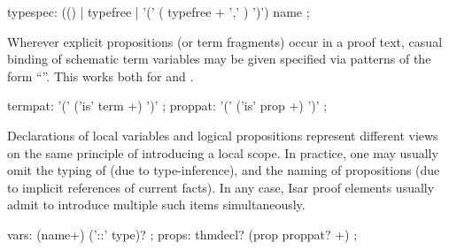 \begin{isabellebody}
\begin{isamarkuptext}
  \begin{rail}
    typespec: (() | typefree | '(' ( typefree + ',' ) ')') name
    ;
  \end{rail}%
\end{isamarkuptext}%
\isamarkuptrue%
%
\isamarkuptrue%
%
\begin{isamarkuptext}%
Wherever explicit propositions (or term fragments) occur in a proof
  text, casual binding of schematic term variables may be given
  specified via patterns of the form ``''.  This works both for  and .

  \begin{rail}
    termpat: '(' ('is' term +) ')'
    ;
    proppat: '(' ('is' prop +) ')'
    ;
  \end{rail}

  \medskip Declarations of local variables  and
  logical propositions  represent different views on
  the same principle of introducing a local scope.  In practice, one
  may usually omit the typing of  (due to
  type-inference), and the naming of propositions (due to implicit
  references of current facts).  In any case, Isar proof elements
  usually admit to introduce multiple such items simultaneously.

  \begin{rail}
    vars: (name+) ('::' type)?
    ;
    props: thmdecl? (prop proppat? +)
    ;
  \end{rail}


\end{isamarkuptext}
\end{isabellebody}

